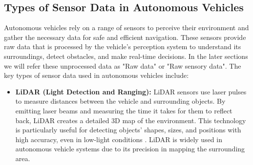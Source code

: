 \subsection{Types of Sensor Data in Autonomous Vehicles}
Autonomous vehicles rely on a range of sensors to perceive their environment and
gather the necessary data for safe and efficient navigation. These sensors provide
raw data that is processed by the vehicle's perception system to understand its
surroundings, detect obstacles, and make real-time decisions.
In the later sections we will refer these unprocessed data as "Raw data" or "Raw sensory data".
The key types of sensor data used in autonomous vehicles include:
\begin{itemize}
    \item \textbf{LiDAR (Light Detection and Ranging):}
    LiDAR sensors use laser pulses to measure distances between the vehicle and surrounding objects.
    By emitting laser beams and measuring the time it takes for them to reflect back, LiDAR creates
    a detailed 3D map of the environment. This technology is particularly useful for detecting objects'
    shapes, sizes, and positions with high accuracy, even in low-light conditions \cite{levinson2011towards}.
    LiDAR is widely used in autonomous vehicle systems due to its precision in mapping the surrounding area.


\end{itemize}

